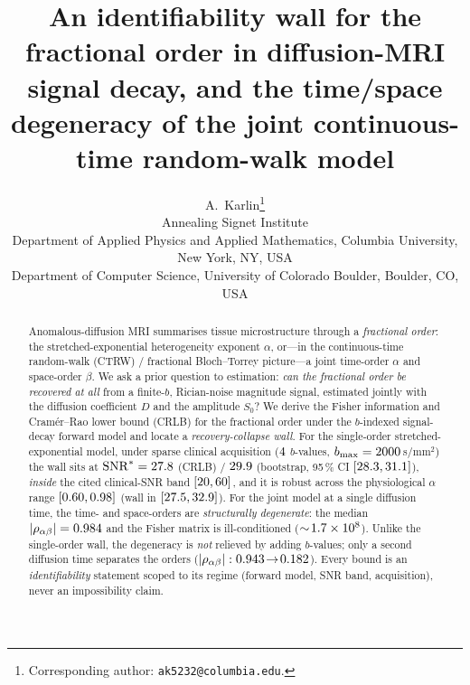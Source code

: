 \documentclass[11pt]{article}
\title{\textbf{An identifiability wall for the fractional order in diffusion-MRI
signal decay, and the time/space degeneracy of the joint continuous-time random-walk model}
}
\author{
A.~Karlin\thanks{Corresponding author: \texttt{ak5232@columbia.edu}.}
\\[2pt]
\small Annealing Signet Institute
\\
\small Department of Applied Physics and Applied Mathematics, Columbia University, New York, NY, USA
\\
\small Department of Computer Science, University of Colorado Boulder, Boulder, CO, USA
}
\date{}
\newcommand{\rhoab}{\rho_{\alpha\beta}}
\begin{document}
\maketitle

\begin{abstract}
\noindent
Anomalous-diffusion MRI summarises tissue microstructure through a \emph{fractional order}:
the stretched-exponential heterogeneity exponent $\alpha$, or---in the continuous-time
random-walk (CTRW) / fractional Bloch--Torrey picture---a joint time-order $\alpha$ and
space-order $\beta$. We ask a prior question to estimation: \emph{can the fractional order be
recovered at all} from a finite-$b$, Rician-noise magnitude signal, estimated jointly with the
diffusion coefficient $D$ and the amplitude $S_0$? We derive the Fisher information and
Cram\'er--Rao lower bound (CRLB) for the fractional order under the $b$-indexed signal-decay
forward model and locate a \emph{recovery-collapse wall}. For the single-order
stretched-exponential model, under sparse clinical acquisition ($4$ $b$-values,
$b_{\max}=2000$\,s/mm$^2$) the wall sits at $\mathrm{SNR}^\ast=27.8$ (CRLB)
/ $29.9$ (bootstrap, 95\,\% CI $[28.3,31.1]$), \emph{inside} the cited
clinical-SNR band $[20,60]$, and it is robust across the physiological
$\alpha$ range $[0.60,0.98]$ (wall in $[27.5,32.9]$).
For the joint model at a single diffusion time, the time- and space-orders are
\emph{structurally degenerate}: the median $|\rhoab|=\numRhoABmedian$ and the Fisher matrix is
ill-conditioned ($\sim\!1.7\times10^{8}$). Unlike the single-order wall, the degeneracy is
\emph{not} relieved by adding $b$-values; only a second diffusion time separates the orders
($|\rhoab|:\numBreakRhoSingle\!\to\!\numBreakRhoTwo$). Every bound is an
\emph{identifiability} statement scoped to its regime (forward model, SNR band, acquisition),
never an impossibility claim.
\end{abstract}

\noindent{}
\end{document}
